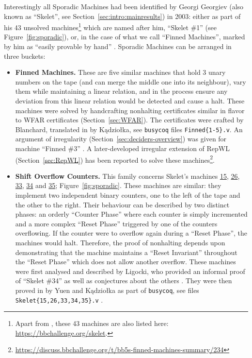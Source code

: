 Interestingly all Sporadic Machines had been identified by Georgi Georgiev (also known as ``Skelet'', see Section~\ref{sec:intro:mainresults}) in 2003: either as part of his 43 unsolved machines\footnote{Apart from \cite{Skelet_bbfind_list}, these 43 machines are also listed here: \url{https://bbchallenge.org/skelet}.} which are named after him, \eg ``Skelet \#1'' (see Figure~\ref{fig:sporadic}), or, in the case of what we call ``Finned Machines'', marked by him as ``easily provable by hand'' \cite{Skelet_bbfind_list}. Sporadic Machines can be arranged in three buckets:
\begin{itemize}
    \item \textbf{Finned Machines.} These are five similar machines that hold 3 unary numbers on the tape (and can merge the middle one into its neighbour), vary them while maintaining a linear relation, and in the process ensure any deviation from this linear relation would be detected and cause a halt. These machines were solved by handcrafting nonhalting certificates similar in flavor to WFAR certificates (Section~\ref{sec:WFAR}). The certificates were crafted by Blanchard, translated in \Coq by Kądziołka, see \texttt{busycoq} files \texttt{Finned\{1-5\}.v}. An argument of irregularity (Section~\ref{sec:deciders-overview}) was given for machine ``Finned \#3'' \cite{irregularFinned3}. A later-developed irregular extension of RepWL (Section~\ref{sec:RepWL}) has been reported to solve these machines\footnote{\url{https://discuss.bbchallenge.org/t/bb5s-finned-machines-summary/234}}.
    \item \textbf{Shift Overflow Counters.} This family concerns Skelet's machines \href{https://bbchallenge.org/1RB---_1RC1LB_1LD1RE_1LB0LD_1RA0RC}{15}, \href{https://bbchallenge.org/1RB1LD_1RC0RB_1LA1RC_1LE0LA_1LC---}{26}, \href{https://bbchallenge.org/1RB1LC_0RC0RB_1LD0LA_1LE---_1LA1RE}{33}, \href{https://bbchallenge.org/1RB1LC_0RC0RB_1LD0LA_1LE---_1LA1RA}{34} and \href{https://bbchallenge.org/1RB1LC_0RC0RB_1LD0LA_1LE---_1LA0LA}{35}; Figure~\ref{fig:sporadic}. These machines are similar: they implement two independent binary counters, one to the left of the tape and the other to the right. Their behaviour can be described by two distinct phases: an orderly ``Counter Phase'' where each counter is simply incremented and a more complex ``Reset Phase'' triggered by one of the counters overflowing. If the counter were to overflow again during a ``Reset Phase'', the machines would halt. Therefore, the proof of nonhalting depends upon demonstrating that the machine maintains a ``Reset Invariant'' throughout the ``Reset Phase'' which does not allow another overflow. These machines were first analysed and described by Ligocki, who provided an informal proof of ``Skelet \#34'' as well as conjectures about the others \cite{ShawnSOC}. They were then proved in \Coq by Yuen and Kądziołka as part of \texttt{busycoq}, see files \texttt{Skelet\{15,26,33,34,35\}.v} \cite{busycoq}.

\end{itemize}
